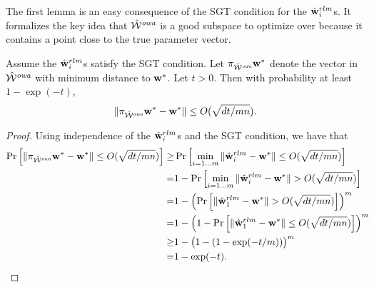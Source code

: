 \documentclass[thesis.tex]{subfiles}
\begin{document}
The first lemma is an easy consequence of the SGT condition for the $\hat{\mathbf w}^{rlm}_i$s.
It formalizes the key idea that ${\hat {{\mathcal W}}^{\textit{owa}}}$ is a good subspace to optimize over because it contains a point close to the true parameter vector.

\begin{lemma}
\label{lemma:wwstar}
Assume the $\hat{\mathbf w}^{rlm}_i$s satisfy the SGT condition.
Let $\pi_{{{\hat {{\mathcal W}}^{\textit{owa}}}}}{\mathbf w^{*}}$ denote the vector in ${\hat {{\mathcal W}}^{\textit{owa}}}$ with minimum distance to ${\mathbf w^{*}}$.
Let $t>0$. 
Then with probability at least $1-\exp(-t)$,
\begin{equation}
\label{eq:wwstar}
{\lVert {\pi_{{{\hat {{\mathcal W}}^{\textit{owa}}}}}{\mathbf w^{*}}-{\mathbf w^{*}}} \rVert} \le O(\sqrt{dt/mn})
.
\end{equation}
\end{lemma}

\begin{proof}
Using independence of the $\hat{\mathbf w}^{rlm}_i$s and the SGT condition, we have that
\begin{align}
    \Pr\left[{{\lVert {\pi_{{{\hat {{\mathcal W}}^{\textit{owa}}}}}{\mathbf w^{*}}-{\mathbf w^{*}}} \rVert} \le O(\sqrt{dt/mn})}\right]
\ge &
\Pr\left[{\min_{i=1...m} {\lVert {\hat{\mathbf w}^{rlm}_i-{\mathbf w^{*}}} \rVert} \le O(\sqrt{dt/mn})}\right]
\\
=&
1-\Pr\left[{\min_{i=1...m} {\lVert {\hat{\mathbf w}^{rlm}_i-{\mathbf w^{*}}} \rVert} > O(\sqrt{dt/mn})}\right]
\\
= &
1-\left(\Pr\left[{{\lVert {\hat{\mathbf w}^{rlm}_1-{\mathbf w^{*}}} \rVert} > O(\sqrt{dt/mn})}\right]\right)^m
\\
= &
1-\left(1-\Pr\left[{{\lVert {\hat{\mathbf w}^{rlm}_1-{\mathbf w^{*}}} \rVert} \le O(\sqrt{dt/mn})}\right]\right)^m\!\!\!
\\
\ge &
1-\big(1-(1-\exp(-t/m))\big)^m
\\
= &
1-\exp(-t)
\label{eq:lemres}
.
\end{align}
\end{proof}
\end{document}
